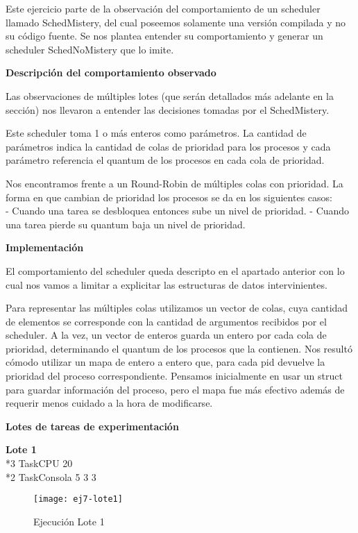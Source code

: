 Este ejercicio parte de la observación del comportamiento de un scheduler llamado SchedMistery, del cual poseemos solamente una versión compilada y no su código fuente. Se nos plantea entender su comportamiento y generar un scheduler SchedNoMistery que lo imite.

\bigskip

\textbf{Descripción del comportamiento observado}

Las observaciones de múltiples lotes (que serán detallados más adelante en la sección) nos llevaron a entender las decisiones tomadas por el SchedMistery.

Este scheduler toma 1 o más enteros como parámetros. La cantidad de parámetros indica la cantidad de colas de prioridad para los procesos y cada parámetro referencia el quantum de los procesos en cada cola de prioridad.

Nos encontramos frente a un Round-Robin de múltiples colas con prioridad. La forma en que cambian de prioridad los procesos se da en los siguientes casos: \\

- Cuando una tarea se desbloquea entonces sube un nivel de prioridad.
- Cuando una tarea pierde su quantum baja un nivel de prioridad.


\textbf{Implementación}

El comportamiento del scheduler queda descripto en el apartado anterior con lo cual nos vamos a limitar a explicitar las estructuras de datos intervinientes.

Para representar las múltiples colas utilizamos un vector de colas, cuya cantidad de elementos se corresponde con la cantidad de argumentos recibidos por el scheduler.
A la vez, un vector de enteros guarda un entero por cada cola de prioridad, determinando el quantum de los procesos que la contienen.
Nos resultó cómodo utilizar un mapa de entero a entero que, para cada pid devuelve la prioridad del proceso correspondiente.
Pensamos inicialmente en usar un struct para guardar información del proceso, pero el mapa fue más efectivo adem\'as de requerir menos cuidado a la hora de modificarse.

\bigskip

\textbf{Lotes de tareas de experimentación}

\bigskip

\textbf{Lote 1} \\
*3 TaskCPU 20 \\
*2 TaskConsola 5 3 3

\begin{figure}[h]
    \texttt{[image: ej7-lote1]}
    \caption{Ejecución Lote 1}
    \label{Lote1}
\end{figure}

